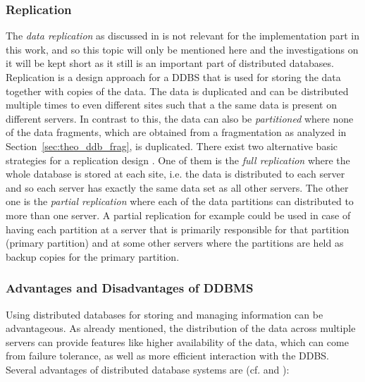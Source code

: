 \subsubsection{Replication}
\label{sec:theo_ddb_repl}
The \emph{data replication} as discussed in \citet{Wiese2014} is not relevant for the implementation part in this work, and so this topic will only be
mentioned here and the investigations on it will be kept short as it still is an important part of distributed databases. Replication is a design approach
for a DDBS that is used for storing the data together with copies of the data. The data is duplicated and can be distributed multiple times to even different
sites such that a the same data is present on different servers. In contrast to this, the data can also be \emph{partitioned} where none of the data fragments,
which are obtained from a fragmentation as analyzed in Section~\ref{sec:theo_ddb_frag}, is duplicated. There exist two alternative basic strategies for a 
replication design \cite[p.~12]{Ozsu1991}. One of them is the \emph{full replication} where the whole database is stored at each site, i.e. the data is
distributed to each server and so each server has exactly the same data set as all other servers. The other one is the \emph{partial replication} where each
of the data partitions can distributed to more than one server. A partial replication for example could be used in case of having each partition at a server 
that is primarily responsible for that partition (primary partition) and at some other servers where the partitions are held as backup copies for the primary
partition.


\subsubsection{Advantages and Disadvantages of DDBMS}
Using distributed databases for storing and managing information can be advantageous. As already mentioned, the distribution of the data across multiple 
servers can provide features like higher availability of the data, which can come from failure tolerance, as well as more efficient interaction with the DDBS. 
Several advantages of distributed database systems are (cf. \citep{Jadhav2017} and \cite[p.~8ff.]{Ozsu1991}):

